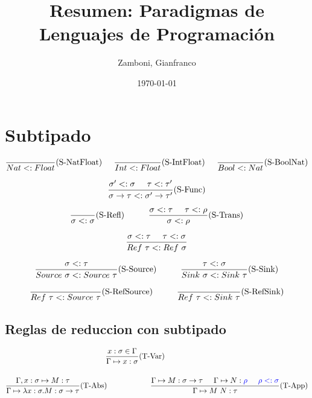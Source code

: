\documentclass[10pt,a4paper]{article}
\begin{document}
\title{Resumen: Paradigmas de Lenguajes de Programación}

\date{\today}

\author{Zamboni, Gianfranco}

\section{Subtipado}

\begin{align*}
\frac{}{Nat <: Float}(\text{S-NatFloat}) \hspace*{5mm}\frac{}{Int <: Float}(\text{S-IntFloat}) \hspace*{5mm}\frac{}{Bool <: Nat}(\text{S-BoolNat})
\end{align*}

$$\frac{\sigma' <: \sigma\hspace*{5mm}\tau <: \tau'}{\sigma\to\tau <: \sigma'\to\tau'}(\text{S-Func})$$

$$\frac{}{\sigma <: \sigma}(\text{S-Refl}) \hspace*{1cm}\frac{\sigma <:\tau\hspace*{5mm}\tau <: \rho}{\sigma <: \rho}(\text{S-Trans})$$

$$\frac{\sigma <: \tau\hspace*{5mm} \tau <: \sigma}{Ref~\tau <: Ref~\sigma}$$

\begin{align*}
\frac{\sigma <: \tau}{Source~\sigma <: Source~\tau}(\text{S-Source})\hspace*{1cm}\frac{\tau <: \sigma}{Sink~\sigma <: Sink~\tau}(\text{S-Sink})
\end{align*}

\begin{align*}
\frac{}{Ref~\tau <: Source~\tau}(\text{S-RefSource})\hspace*{1cm}\frac{}{Ref~\tau <: Sink~\tau}(\text{S-RefSink})
\end{align*}
\subsection{Reglas de reduccion con subtipado}

\begin{equation*}
\begin{gathered}
    \frac{x:\sigma\in\Gamma}{\judgeTypeS{\Gamma}{x}{\sigma}}(\text{T-Var})\hspace*{2cm}
\vspace*{5mm} \\
    \frac {\judgeTypeS{\Gamma,x:\sigma}{M}{\tau}}
          {\judgeTypeS{\Gamma}{\lambdaAbs{x}{\sigma}{M}}{\sigma\to\tau}}(\text{T-Abs})\hspace*{2cm}
    \frac{\judgeTypeS{\Gamma}{M}{\sigma\to\tau}\hspace*{5mm}\judgeTypeS{\Gamma}{N}{\blue{\rho}}\hspace*{5mm}\blue{\rho <: \sigma}}{\judgeTypeS{\Gamma}{M~N}{\tau}}(\text{T-App})
\end{gathered}
\end{equation*}
\end{document}
